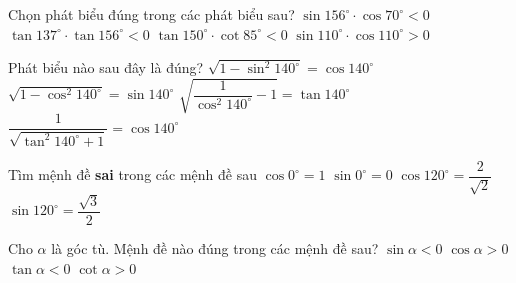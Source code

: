 \begin{ex} 
	Chọn phát biểu đúng trong các phát biểu sau?
	\choice
	{$\sin 156^\circ\cdot\cos70^\circ<0$}
	{$\tan 137^\circ\cdot\tan 156^\circ<0$}
	{\True $\tan150^\circ\cdot\cot85^\circ<0$}
	{$\sin 110^\circ\cdot\cos 110^\circ>0$}
\end{ex}
\begin{ex} 
	Phát biểu nào sau đây là đúng?
	\choice
	{$\sqrt{1-\sin^2 140^\circ}=\cos 140^\circ$}
	{\True $\sqrt{1-\cos^2 140^\circ}=\sin 140^\circ$}
	{$\sqrt{\dfrac{1}{\cos^2 140^\circ}-1}=\tan 140^\circ$}
	{$\dfrac{1}{\sqrt{\tan^2 140^\circ+1}}=\cos 140^\circ$}
\end{ex}
\begin{ex}
	Tìm mệnh đề \textbf{sai} trong các mệnh đề sau
	\choice
	{$\cos 0^\circ=1$}
	{$\sin 0^\circ=0$}
	{\True $\cos 120^\circ=\dfrac{2}{\sqrt{2}}$}
	{$\sin 120^\circ=\dfrac{\sqrt{3}}{2}$}
\end{ex}
\begin{ex}
	Cho $\alpha$ là góc tù. Mệnh đề nào đúng trong các mệnh đề sau?
	\choice
	{$\sin\alpha<0$}
	{$\cos\alpha>0$}
	{\True $\tan\alpha<0$}
	{$\cot\alpha>0$}
\end{ex}
